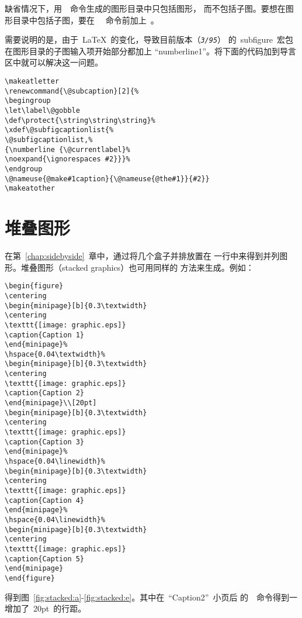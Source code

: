 缺省情况下，用~~命令生成的图形目录中只包括图形，
而不包括子图。要想在图形目录中包括子图，要在~~
命令前加上~。

需要说明的是，由于~\LaTeX{}~的变化，导致目前版本（\texttt{\textit{3/95}}）
的~\textsf{subfigure}~宏包在图形目录的子图输入项开始部分都加上
``numberline1''。将下面的代码加到导言区中就可以解决这一问题。
\begin{Verbatim}[xleftmargin=1cm]
\makeatletter 
\renewcommand{\@subcaption}[2]{% 
\begingroup 
\let\label\@gobble 
\def\protect{\string\string\string}% 
\xdef\@subfigcaptionlist{% 
\@subfigcaptionlist,% 
{\numberline {\@currentlabel}% 
\noexpand{\ignorespaces #2}}}% 
\endgroup 
\@nameuse{@make#1caption}{\@nameuse{@the#1}}{#2}} 
\makeatother
\end{Verbatim} 

\section{堆叠图形}

在第~\ref{chap:sidebyside}~章中，通过将几个盒子并排放置在
一行中来得到并列图形。堆叠图形（stacked graphics）也可用同样的
方法来生成。例如：
\begin{Verbatim}[xleftmargin=1cm]
\begin{figure} 
\centering 
\begin{minipage}[b]{0.3\textwidth} 
\centering 
\texttt{[image: graphic.eps]} 
\caption{Caption 1}
\end{minipage}% 
\hspace{0.04\textwidth}% 
\begin{minipage}[b]{0.3\textwidth} 
\centering 
\texttt{[image: graphic.eps]} 
\caption{Caption 2} 
\end{minipage}\\[20pt] 
\begin{minipage}[b]{0.3\textwidth} 
\centering 
\texttt{[image: graphic.eps]} 
\caption{Caption 3} 
\end{minipage}% 
\hspace{0.04\linewidth}% 
\begin{minipage}[b]{0.3\textwidth} 
\centering 
\texttt{[image: graphic.eps]} 
\caption{Caption 4} 
\end{minipage}% 
\hspace{0.04\linewidth}% 
\begin{minipage}[b]{0.3\textwidth} 
\centering 
\texttt{[image: graphic.eps]} 
\caption{Caption 5} 
\end{minipage} 
\end{figure}
\end{Verbatim}
得到图~\ref{fig:stacked:a}-\ref{fig:stacked:e}。其中在~``Caption2''~小页后
的~\texttt{\bs\bs[20pt]}~命令得到一增加了~20pt~的行距。


